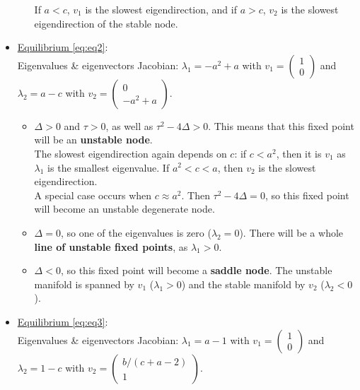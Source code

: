 \documentclass[a4paper,11pt]{article}
\begin{document}
\begin{itemize}
\begin{itemize}
			  If $a<c$, $v_1$ is the slowest eigendirection, and if $a>c$, $v_2$ is the slowest eigendirection of the stable node.
		\end{itemize}
	\item \underline{Equilibrium \eqref{eq:eq2}}: \\
		Eigenvalues \& eigenvectors Jacobian: $\lambda_1=-a^2+a$ with $v_1=\begin{pmatrix}1\\0\end{pmatrix}$ and\\ $\lambda_2=a-c$ with $v_2=\begin{pmatrix}0\\- a^2 + a\end{pmatrix}$.
		\begin{itemize}
			\item[\boxed{\textbf{0<c<a}}  ] $\Delta>0$ and $\tau>0$, as well as $\tau^2-4\Delta>0$. This means that this fixed point will be an \textbf{unstable node}.\\
			The slowest eigendirection again depends on $c$: if $c<a^2$, then it is $v_1$ as $\lambda_1$ is the smallest
			eigenvalue. If $a^2<c<a$, then $v_2$ is the slowest eigendirection.\\
			A special case occurs when $c\approx a^2$. Then $\tau^2-4\Delta=0$, so this fixed point will become an unstable degenerate node.
			\item[\boxed{\mathbf{c\approx a}}  ] $\Delta=0$, so one of the eigenvalues is zero ($\lambda_2=0$). There will be a whole \textbf{line of unstable fixed points}, as $\lambda_1>0$.
   			\item[\boxed{\textbf{c>a}}  ] $\Delta<0$, so this fixed point will become a \textbf{saddle node}. The unstable manifold is spanned by $v_1$ ($\lambda_1>0$) and the stable 
			   manifold by $v_2$ ($\lambda_2<0$).
		\end{itemize}
	\item \underline{Equilibrium \eqref{eq:eq3}}: \\
		Eigenvalues \& eigenvectors Jacobian: $\lambda_1=a-1$ with $v_1=\begin{pmatrix}1\\0\end{pmatrix}$ and\\ $\lambda_2=1-c$ with $v_2=\begin{pmatrix}b/(c + a - 2)\\1\end{pmatrix}$.
		\begin{itemize}

\end{itemize}
\end{itemize}
\end{document}
